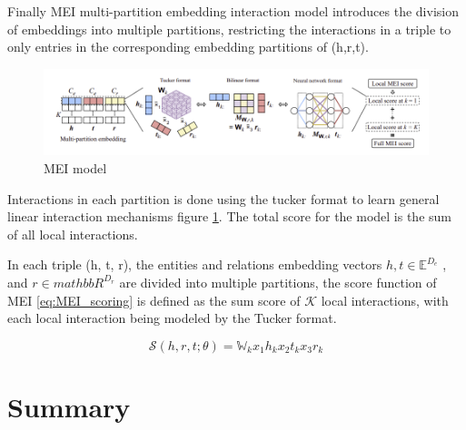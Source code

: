 Finally MEI \cite{} multi-partition embedding interaction model introduces the division of embeddings into multiple partitions, restricting the interactions in a triple to only entries in the corresponding embedding partitions of (h,r,t).

\begin{figure}[!ht]
    \centering
    \includegraphics[width=\textwidth]{fig/embeddings/MEI.png}
    \caption{MEI model}
    \label{fig:emb-MEI}
\end{figure}

Interactions in each partition is done using the tucker format\cite{} to learn general linear interaction mechanisms figure \ref{fig:emb-MEI}. The total score for the model is the sum of all local interactions. 

In each triple (h, t, r), the entities and relations embedding vectors $h, t \in \mathbb{E}^{D_e}$ , and $r \in mathbb{R}^{D_r}$ are divided into multiple partitions, the score function of MEI \ref{eq:MEI_scoring} is defined as the sum score of $\mathcal{K}$ local interactions, with each local interaction being modeled by the Tucker format.

\begin{equation}
    \label{eq:MEI_scoring}
    \mathcal{S}(h, r, t; \theta) = \mathbb{W}_k x_1 h_k x_2 t_k x_3 r_k
\end{equation}

\section{Summary}\label{sec:emb-summary}

